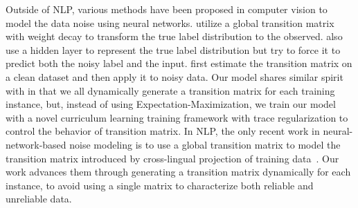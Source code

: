 
Outside of NLP, various methods have been proposed in computer vision  to 
 model the data noise using neural networks.
\cite{sukhbaatar2014training}  utilize a global transition matrix with weight decay to transform the true label distribution to 
the observed.  %
\cite{reed2014training} also use a hidden layer to represent the true label distribution but try to force it to predict both the noisy label and the input. \cite{chen2015webly,xiao2015learning} first estimate the transition matrix on a clean dataset and then apply it to noisy data. 
Our model shares similar spirit with \cite{misra2016seeing} in that we all dynamically generate a transition matrix for each
training instance, but, instead of using Expectation-Maximization, we train our model with a novel curriculum learning training framework with trace regularization to control the behavior of transition matrix.
In NLP, the only recent work in neural-network-based noise modeling is to use a global transition matrix to model the transition matrix introduced by
cross-lingual projection of training data~\cite{fang2016learning}.
 Our work advances them through generating a transition matrix dynamically for each instance, to avoid using a single matrix to characterize both reliable and unreliable data. 



